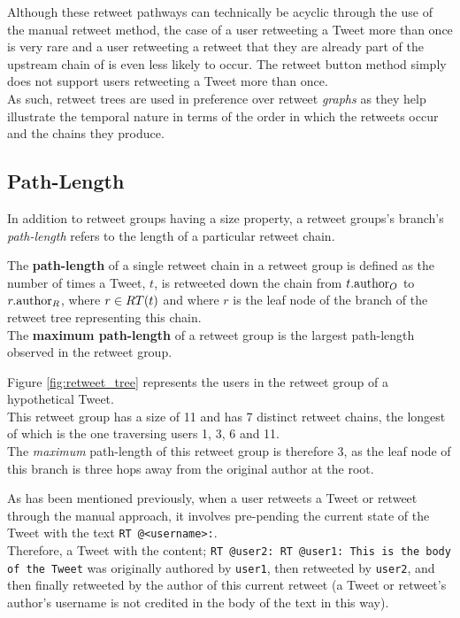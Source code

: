 Although these retweet pathways can technically be acyclic through the use of the manual retweet method, the case of a user retweeting a Tweet more than once is very rare and a user retweeting a retweet that they are already part of the upstream chain of is even less likely to occur. The retweet button method simply does not support users retweeting a Tweet more than once.\\
As such, retweet trees are used in preference over retweet \textit{graphs} as they help illustrate the temporal nature in terms of the order in which the retweets occur and the chains they produce.


\subsection{Path-Length}
In addition to retweet groups having a size property, a retweet groups's branch's \textit{path-length} refers to the length of a particular retweet chain. 

\begin{mydefinition}
The \textbf{path-length} of a single retweet chain in a retweet group is defined as the number of times a Tweet, $t$, is retweeted down the chain from $t.\textrm{author}_O$ to $r.\textrm{author}_R$, where $r \in RT(t)$ and where $r$ is the leaf node of the branch of the retweet tree representing this chain.\\
The \textbf{maximum path-length} of a retweet group is the largest path-length observed in the retweet group.
\end{mydefinition}

Figure \ref{fig:retweet_tree} represents the users in the retweet group of a hypothetical Tweet.\\
This retweet group has a size of 11 and has 7 distinct retweet chains, the longest of which is the one traversing users 1, 3, 6 and 11.\\
The \textit{maximum} path-length of this retweet group is therefore 3, as the leaf node of this branch is three hops away from the original author at the root.

As has been mentioned previously, when a user retweets a Tweet or retweet through the manual approach, it involves pre-pending the current state of the Tweet with the text \texttt{RT @<username>:}.\\
Therefore, a Tweet with the content;\newline
\texttt{RT @user2: RT @user1: This is the body of the Tweet}\newline
was originally authored by \texttt{user1}, then retweeted by \texttt{user2}, and then finally retweeted by the author of this current retweet (a Tweet or retweet's author's username is not credited in the body of the text in this way).

